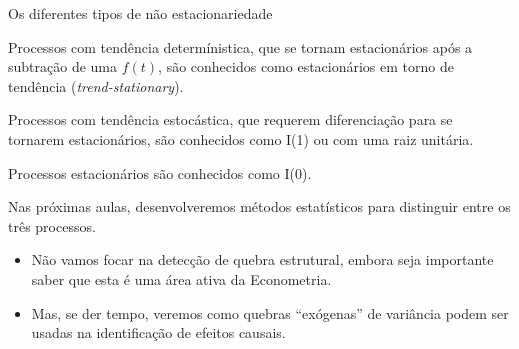 \documentclass[11pt]{beamer}
\newenvironment{halfwideitemize}{\itemize\addtolength{\itemsep}{0.5em}}{\enditemize}
\begin{document}
\begin{frame}{Os diferentes tipos de não estacionariedade}
	\begin{halfwideitemize}
		\item Processos com tendência determínistica, que se tornam estacionários após a subtração de uma $f(t)$, são conhecidos como estacionários em torno de tendência ({\color{blue}\textit{trend-stationary}}). 
					\item Processos com {\color{blue}tendência estocástica, que requerem diferenciação para se tornarem estacionários}, são conhecidos como {\color{blue}I(1) ou com uma raiz unitária}.
		\item Processos {\color{blue}estacionários} são conhecidos como {\color{blue}I(0)}.
		\item Nas próximas aulas, desenvolveremos métodos estatísticos para distinguir entre os três processos.
		\begin{itemize}
			\item Não vamos focar na detecção de quebra estrutural, embora seja importante saber que esta é uma área ativa da Econometria.
			\item Mas, se der tempo, veremos como quebras ``exógenas'' de variância podem ser usadas na identificação de efeitos causais.
		\end{itemize} 
	\end{halfwideitemize}

\end{frame}


\end{document}
